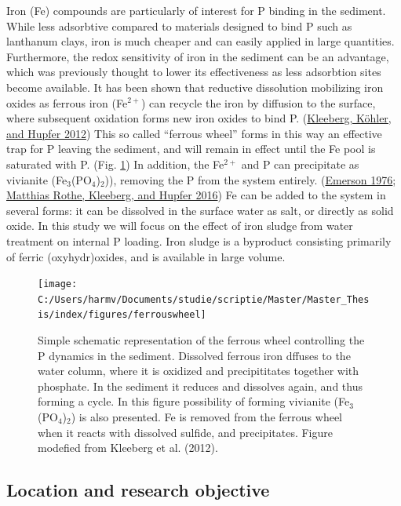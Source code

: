 \documentclass[a4paper,11pt]{article}
\begin{document}
Iron (Fe) compounds are particularly of interest for P binding in the sediment. While less adsorbtive compared to materials designed to bind P such as lanthanum clays, iron is much cheaper and can easily applied in large quantities. Furthermore, the redox sensitivity of iron in the sediment can be an advantage, which was previously thought to lower its effectiveness as less adsorbtion sites become available. It has been shown that reductive dissolution mobilizing iron oxides as ferrous iron (Fe\(^{2+}\)) can recycle the iron by diffusion to the surface, where subsequent oxidation forms new iron oxides to bind P. (\protect\hyperlink{ref-kleebergHowEffectivelyDoes2012}{Kleeberg, Köhler, and Hupfer 2012}) This so called ``ferrous wheel'' forms in this way an effective trap for P leaving the sediment, and will remain in effect until the Fe pool is saturated with P. (Fig. \ref{fig:fwheel}) In addition, the Fe\(^{2+}\) and P can precipitate as vivianite (Fe\(_3\)(PO\(_4\))\(_2\))), removing the P from the system entirely. (\protect\hyperlink{ref-emersonEarlyDiagenesisAnaerobic1976}{Emerson 1976}; \protect\hyperlink{ref-rotheOccurrenceIdentificationEnvironmental2016}{Matthias Rothe, Kleeberg, and Hupfer 2016}) Fe can be added to the system in several forms: it can be dissolved in the surface water as salt, or directly as solid oxide. In this study we will focus on the effect of iron sludge from water treatment on internal P loading. Iron sludge is a byproduct consisting primarily of ferric (oxyhydr)oxides, and is available in large volume.
\begin{figure}

{\centering \texttt{[image: C:/Users/harmv/Documents/studie/scriptie/Master/Master\_Thesis/index/figures/ferrouswheel]} 

}

\caption{Simple schematic representation of the ferrous wheel controlling the P dynamics in the sediment. Dissolved ferrous iron dffuses to the water column, where it is oxidized and precipititates together with phosphate. In the sediment it reduces and dissolves again, and thus forming a cycle. In this figure possibility of forming vivianite (Fe$_3$(PO$_4$)$_2$) is also presented. Fe is removed from the ferrous wheel when it reacts with dissolved sulfide, and precipitates. Figure modefied from  Kleeberg et al. (2012).}\label{fig:fwheel}
\end{figure}
\hypertarget{location-and-research-objective}{%
\subsection{Location and research objective}\label{location-and-research-objective}}
\end{document}
